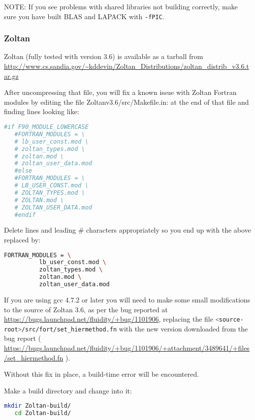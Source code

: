 NOTE: If you see problems with shared libraries not building correctly, make
sure you have built BLAS and LAPACK with \lstinline[language=bash]+-fPIC+.

\subsubsection{Zoltan}
\label{sec:required_libraries_numerical_zoltan}

Zoltan (fully tested with version 3.6) is available as a tarball from  
\url{http://www.cs.sandia.gov/~kddevin/Zoltan_Distributions/zoltan_distrib_v3.6.tar.gz}

After uncompressing that file, you will fix a known issue with Zoltan Fortran
modules by editing the file Zoltan{\textunderscore}v3.6/src/Makefile.in: at the
end of that file and finding lines looking like:

\begin{lstlisting}[language=bash]
   #if F90_MODULE_LOWERCASE
   #FORTRAN_MODULES = \
   # lb_user_const.mod \
   # zoltan_types.mod \
   # zoltan.mod \
   # zoltan_user_data.mod
   #else
   #FORTRAN_MODULES = \
   # LB_USER_CONST.mod \
   # ZOLTAN_TYPES.mod \
   # ZOLTAN.mod \
   # ZOLTAN_USER_DATA.mod
   #endif
\end{lstlisting}

Delete lines and leading \# characters appropriately so you end up with the above replaced by:

\begin{lstlisting}[language=bash]
   FORTRAN_MODULES = \
          lb_user_const.mod \
          zoltan_types.mod \
          zoltan.mod \
          zoltan_user_data.mod
\end{lstlisting}

If you are using gcc 4.7.2 or later you will need to make some small
modifications to the source of Zoltan 3.6, as per the bug reported at
\url{https://bugs.launchpad.net/fluidity/+bug/1101906}, replacing the file
\lstinline[language=bash]+<source-root>/src/fort/set_hiermethod.fn+ with the
new version downloaded from the bug report (
\url{https://bugs.launchpad.net/fluidity/+bug/1101906/+attachment/3489641/+files/set_hiermethod.fn}
).

Without this fix in place, a build-time error will be encountered.

Make a build directory and change into it:

\begin{lstlisting}[language=bash]
   mkdir Zoltan-build/
   cd Zoltan-build/
\end{lstlisting}

